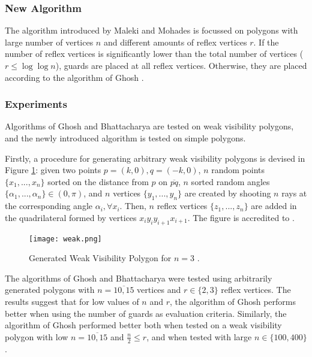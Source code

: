 \newpage
\subsubsection{New Algorithm}
The algorithm introduced by Maleki and Mohades is focussed on polygons with large number of vertices $n$ and different amounts of reflex vertices $r$. If the number of reflex vertices is significantly lower than the total number of vertices ($r \leq \log \log n$), guards are placed at all reflex vertices. Otherwise, they are placed according to the algorithm of Ghosh \cite{GHOSH2010718}.

\subsubsection{Experiments}
Algorithms of Ghosh \cite{GHOSH2010718} and Bhattacharya \cite{bhattacharya2016approximability} are tested on weak visibility polygons, and the newly introduced algorithm is tested on simple polygons. 

Firstly, a procedure for generating arbitrary weak visibility polygons is devised in Figure \ref{fig:weak}: given two points $p = (k, 0), q = (-k, 0)$,  $n$ random points $\{x_1, ..., x_n\}$ sorted on the distance from $p$ on $\overline{pq}$, $n$ sorted random angles $\{\alpha_1, ..., \alpha_n\} \in  (0, \pi)$, and $n$ vertices $\{y_1, ..., y_n\}$ are created by shooting $n$ rays at the corresponding angle $\alpha_i, \forall x_i$. Then, $n$ reflex vertices $\{z_1, ..., z_n\}$ are added in the quadrilateral formed by vertices $x_iy_iy_{i + 1}x_{i + 1}$. The figure is accredited to \cite{maleki2022implementation}.

\begin{figure}[h!]
    \centering
    \texttt{[image: weak.png]}
    \caption{Generated Weak Visibility Polygon for $n = 3$ \cite{maleki2022implementation}.}
    \label{fig:weak}
\end{figure}

The algorithms of Ghosh \cite{GHOSH2010718} and Bhattacharya \cite{bhattacharya2016approximability} were tested using arbitrarily generated polygons with $n = \overline{10, 15}$ vertices and $r \in \{2, 3\}$ reflex vertices. The results suggest that for low values of $n$ and $r$, the algorithm of Ghosh \cite{GHOSH2010718} performs better when using the number of guards as evaluation criteria. 
Similarly, the algorithm of Ghosh \cite{GHOSH2010718} performed better both when tested on a weak visibility polygon with low $n = \overline{10, 15}$ and $\frac n 2 \leq r$, and when tested with large $n \in \{100, 400\}$.


